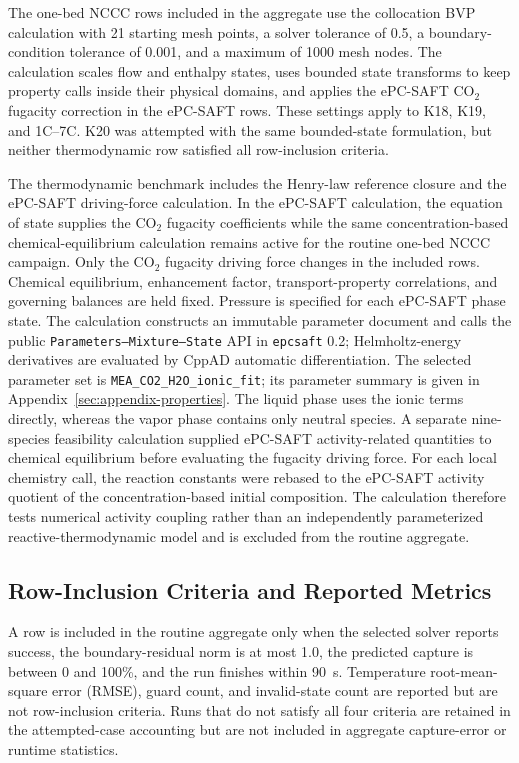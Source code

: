             The one-bed NCCC rows included in the aggregate use the collocation BVP calculation with 21 starting mesh points, a solver tolerance of 0.5, a boundary-condition tolerance of 0.001, and a maximum of 1000 mesh nodes. The calculation scales flow and enthalpy states, uses bounded state transforms to keep property calls inside their physical domains, and applies the ePC-SAFT CO$_2$ fugacity correction in the ePC-SAFT rows. These settings apply to K18, K19, and 1C--7C. K20 was attempted with the same bounded-state formulation, but neither thermodynamic row satisfied all row-inclusion criteria.

            The thermodynamic benchmark includes the Henry-law reference closure and the ePC-SAFT driving-force calculation. In the ePC-SAFT calculation, the equation of state supplies the CO$_2$ fugacity coefficients while the same concentration-based chemical-equilibrium calculation remains active for the routine one-bed NCCC campaign. Only the CO$_2$ fugacity driving force changes in the included rows. Chemical equilibrium, enhancement factor, transport-property correlations, and governing balances are held fixed. Pressure is specified for each ePC-SAFT phase state. The calculation constructs an immutable parameter document and calls the public \texttt{Parameters--Mixture--State} API in \texttt{epcsaft} 0.2; Helmholtz-energy derivatives are evaluated by CppAD automatic differentiation. The selected parameter set is \texttt{MEA\_CO2\_H2O\_ionic\_fit}; its parameter summary is given in Appendix~\ref{sec:appendix-properties}. The liquid phase uses the ionic terms directly, whereas the vapor phase contains only neutral species. A separate nine-species feasibility calculation supplied ePC-SAFT activity-related quantities to chemical equilibrium before evaluating the fugacity driving force. For each local chemistry call, the reaction constants were rebased to the ePC-SAFT activity quotient of the concentration-based initial composition. The calculation therefore tests numerical activity coupling rather than an independently parameterized reactive-thermodynamic model and is excluded from the routine aggregate.

        \subsection{Row-Inclusion Criteria and Reported Metrics}
            A row is included in the routine aggregate only when the selected solver reports success, the boundary-residual norm is at most 1.0, the predicted capture is between 0 and 100\%, and the run finishes within \SI{90}{s}. Temperature root-mean-square error (RMSE), guard count, and invalid-state count are reported but are not row-inclusion criteria. Runs that do not satisfy all four criteria are retained in the attempted-case accounting but are not included in aggregate capture-error or runtime statistics.

